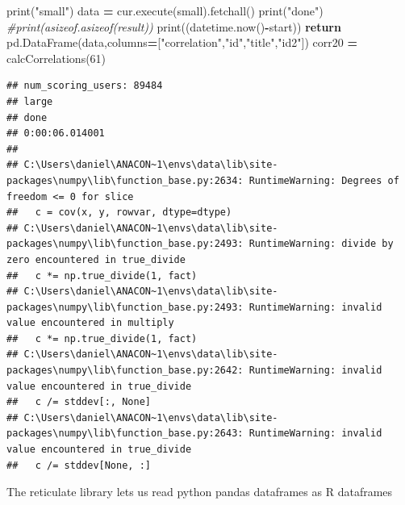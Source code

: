\documentclass[
]{article}
\newenvironment{Shaded}{\begin{snugshade}}{\end{snugshade}}
\newcommand{\BuiltInTok}[1]{#1}
\newcommand{\CommentTok}[1]{\textcolor[rgb]{0.56,0.35,0.01}{\textit{#1}}}
\newcommand{\ControlFlowTok}[1]{\textcolor[rgb]{0.13,0.29,0.53}{\textbf{#1}}}
\newcommand{\DecValTok}[1]{\textcolor[rgb]{0.00,0.00,0.81}{#1}}
\newcommand{\FunctionTok}[1]{\textcolor[rgb]{0.00,0.00,0.00}{#1}}
\newcommand{\NormalTok}[1]{#1}
\newcommand{\OperatorTok}[1]{\textcolor[rgb]{0.81,0.36,0.00}{\textbf{#1}}}
\newcommand{\SpecialCharTok}[1]{\textcolor[rgb]{0.00,0.00,0.00}{#1}}
\newcommand{\StringTok}[1]{\textcolor[rgb]{0.31,0.60,0.02}{#1}}
\begin{document}
\begin{Shaded}
\begin{Highlighting}[]
        \BuiltInTok{print}\NormalTok{(}\StringTok{"small"}\NormalTok{)}
\NormalTok{        data }\OperatorTok{=}\NormalTok{ cur.execute(small).fetchall()}
    \BuiltInTok{print}\NormalTok{(}\StringTok{"done"}\NormalTok{)}
    \CommentTok{\#print(asizeof.asizeof(result))}
    \BuiltInTok{print}\NormalTok{((datetime.now()}\OperatorTok{{-}}\NormalTok{start))}
    \ControlFlowTok{return}\NormalTok{ pd.DataFrame(data,columns}\OperatorTok{=}\NormalTok{[}\StringTok{"correlation"}\NormalTok{,}\StringTok{"id"}\NormalTok{,}\StringTok{"title"}\NormalTok{,}\StringTok{"id2"}\NormalTok{])}
\NormalTok{corr20 }\OperatorTok{=}\NormalTok{ calcCorrelations(}\DecValTok{61}\NormalTok{)}
\end{Highlighting}
\end{Shaded}

\begin{verbatim}
## num_scoring_users: 89484
## large
## done
## 0:00:06.014001
## 
## C:\Users\daniel\ANACON~1\envs\data\lib\site-packages\numpy\lib\function_base.py:2634: RuntimeWarning: Degrees of freedom <= 0 for slice
##   c = cov(x, y, rowvar, dtype=dtype)
## C:\Users\daniel\ANACON~1\envs\data\lib\site-packages\numpy\lib\function_base.py:2493: RuntimeWarning: divide by zero encountered in true_divide
##   c *= np.true_divide(1, fact)
## C:\Users\daniel\ANACON~1\envs\data\lib\site-packages\numpy\lib\function_base.py:2493: RuntimeWarning: invalid value encountered in multiply
##   c *= np.true_divide(1, fact)
## C:\Users\daniel\ANACON~1\envs\data\lib\site-packages\numpy\lib\function_base.py:2642: RuntimeWarning: invalid value encountered in true_divide
##   c /= stddev[:, None]
## C:\Users\daniel\ANACON~1\envs\data\lib\site-packages\numpy\lib\function_base.py:2643: RuntimeWarning: invalid value encountered in true_divide
##   c /= stddev[None, :]
\end{verbatim}

The reticulate library lets us read python pandas dataframes as R
dataframes

\begin{Shaded}
\end{Shaded}
\end{document}
